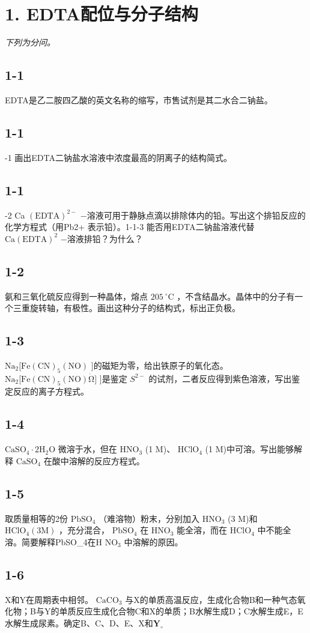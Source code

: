 \section*{1. EDTA配位与分子结构}
\textit{下列为分问。}

\subsection*{1-1}
EDTA是⼄⼆胺四⼄酸的英⽂名称的缩写，市售试剂是其⼆⽔合⼆钠盐。

\subsection*{1-1}
-1 画出EDTA⼆钠盐⽔溶液中浓度最⾼的阴离⼦的结构简式。

\subsection*{1-1}
-2 Ca $( \mathrm { E D T A } ) ^ { 2 - }$ −溶液可⽤于静脉点滴以排除体内的铅。写出这个排铅反应的化学⽅程式（⽤Pb2+ 表⽰铅）。1-1-3 能否⽤EDTA⼆钠盐溶液代替 $\mathrm { C a ( E D T A ) ^ { 2 } }$ −溶液排铅？为什么？

\subsection*{1-2}
氨和三氧化硫反应得到⼀种晶体，熔点 $2 0 5 ~ ^ { \circ } \mathrm { C }$ ，不含结晶⽔。晶体中的分⼦有⼀个三重旋转轴，有极性。画出这种分⼦的结构式，标出正负极。

\subsection*{1-3}
$\mathrm { N a _ { 2 } [ F e ( C N ) _ { 5 } ( N O ) }$ ]的磁矩为零，给出铁原⼦的氧化态。 $\mathrm { N a _ { 2 } [ F e ( C N ) _ { 5 } ( N O ) } \mathrm { \dot { \Omega } ] }$ ]是鉴定 $S ^ { 2 - }$ 的试剂，⼆者反应得到紫⾊溶液，写出鉴定反应的离⼦⽅程式。

\subsection*{1-4}
$\mathrm { C a S O _ { 4 } { \cdot } 2 H _ { 2 } O }$ 微溶于⽔，但在 $\mathrm { H N O _ { 3 } }$ (1 M)、 $\mathrm { H C l O _ { 4 } }$ (1 M)中可溶。写出能够解释 $\mathrm { C a S O _ { 4 } }$ 在酸中溶解的反应⽅程式。

\subsection*{1-5}
取质量相等的2份 $\mathrm { P b S O _ { 4 } }$ （难溶物）粉末，分别加⼊ $\mathrm { H N O _ { 3 } }$ (3 M)和 $\mathrm { H C l O _ { 4 } } \left( 3 \mathrm { M } \right)$ ，充分混合， $\mathrm { P b S O _ { 4 } }$ 在 $\mathrm { H N O _ { 3 } }$ 能全溶，⽽在 $\mathrm { H C l O _ { 4 } }$ 中不能全溶。简要解释PbSO_{4}在H $\mathrm { N O _ { 3 } }$ 中溶解的原因。

\subsection*{1-6}
X和Y在周期表中相邻。 $\mathrm { C a C O _ { 3 } }$ 与X的单质⾼温反应，⽣成化合物B和⼀种⽓态氧化物；B与Y的单质反应⽣成化合物C和X的单质；B⽔解⽣成D；C⽔解⽣成E，E⽔解⽣成尿素。确定B、C、D、E、X和$\mathbf { Y } _ { \circ }$
